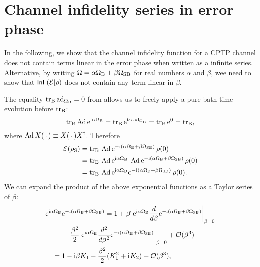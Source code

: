 \documentclass[aps,pra,reprint,superscriptaddress]{revtex4-2}
\begin{document}


\appendix
\section{Channel infidelity series in error phase}\label{app:infid-beta-series}
In the following, we show that the channel infidelity function  for a CPTP channel does not contain terms linear in the error phase when written as a infinite series.
Alternative, by writing  
$\Omega =  \alpha \Omega_{\mathrm{B}} + \beta \Omega_{\mathrm{SB}}$ for real numbers $\alpha$ and $\beta$, wee need to show that $\operatorname{\mathsf{InF}}(\mathcal{E}|\rho)$ does not contain any term linear in $\beta$.

The equality $\operatorname{\operatorname{tr}_\mathrm{B}} \operatorname{ad}_{\Omega_{\mathrm{B}}} = 0$ from  allows us to freely apply a pure-bath time evolution before $\operatorname{\operatorname{tr}_\mathrm{B}}$:
\begin{equation}
    \operatorname{\operatorname{tr}_\mathrm{B}} \operatorname{Ad} \mathrm{e}^{\mathrm{i} \alpha \Omega_{\mathrm{B}}} = \operatorname{\operatorname{tr}_\mathrm{B}} \mathrm{e}^{\mathrm{i} \alpha \operatorname{ad}_{\Omega_{\mathrm{B}}}} = \operatorname{\operatorname{tr}_\mathrm{B}} \mathrm{e}^{0} = \operatorname{\operatorname{tr}_\mathrm{B}},
\end{equation}
where $\operatorname{Ad} X ({\,\cdot\,})\equiv X ({\,\cdot\,}) X^\dagger$.
Therefore
\begin{equation}\label{eq:rhoS-interaction}
\begin{split}
\mathcal{E}(\rho_\mathrm{S}) &= \operatorname{\operatorname{tr}_\mathrm{B}}\, \operatorname{Ad} \mathrm{e}^{-\mathrm{i} (\alpha \Omega_{\mathrm{B}} + \beta \Omega_{\mathrm{SB}})} \, \rho(0)\\
&= \operatorname{\operatorname{tr}_\mathrm{B}}\, \operatorname{Ad} \mathrm{e}^{\mathrm{i} \alpha \Omega_{\mathrm{B}}}\, \operatorname{Ad} \mathrm{e}^{-\mathrm{i} (\alpha \Omega_{\mathrm{B}} + \beta \Omega_{\mathrm{SB}})} \, \rho(0) \\
&= \operatorname{\operatorname{tr}_\mathrm{B}}\, \operatorname{Ad} \mathrm{e}^{\mathrm{i} \alpha \Omega_{\mathrm{B}}} \mathrm{e}^{-\mathrm{i} (\alpha \Omega_{\mathrm{B}} + \beta \Omega_{\mathrm{SB}})}\, \rho(0).
\end{split}
\end{equation}
We can expand the product of the above exponential functions as a Taylor series of $\beta$:
\begin{align}
\mathrm{e}^{\mathrm{i} \alpha \Omega_{\mathrm{B}}} &\mathrm{e}^{-\mathrm{i} (\alpha \Omega_{\mathrm{B}} + \beta \Omega_{\mathrm{SB}})} 
= 1 + \beta
\left. \mathrm{e}^{\mathrm{i} \alpha \Omega_{\mathrm{B}}} \frac{d}{d\beta}\mathrm{e}^{-\mathrm{i} (\alpha \Omega_{\mathrm{B}} + \beta \Omega_{\mathrm{SB}})} \right|_{\beta=0} \notag \\
&+ \frac{\beta^2}{2}
\left. \mathrm{e}^{\mathrm{i} \alpha \Omega_{\mathrm{B}}} \frac{d^2}{d\beta^2}\mathrm{e}^{-\mathrm{i} (\alpha \Omega_{\mathrm{B}} + \beta \Omega_{\mathrm{SB}})} \right|_{\beta=0} +\mathcal{O}(\beta^3) \notag \\
={}& 1 - \mathrm{i} \beta K_1 -\frac{\beta^2}{2} (K_1^2+ \mathrm{i} K_2)  + \mathcal{O}(\beta^3),
\end{align}
\end{document}
